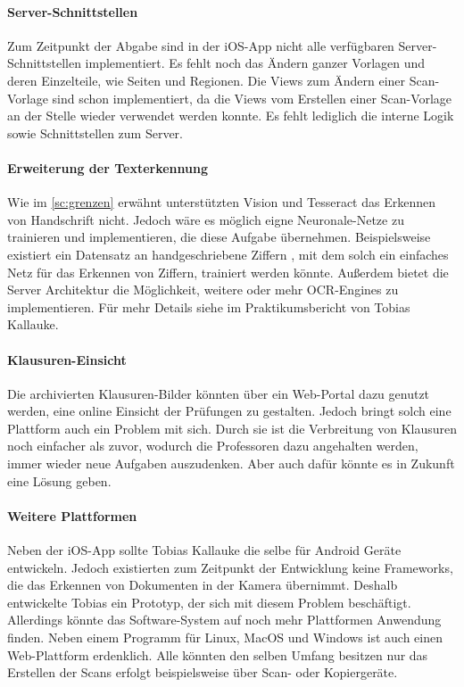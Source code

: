 \documentclass[notables, nomenclature, oneside, 150]{HSMW-Thesis}
\begin{document}
	
	\paragraph*{Server-Schnittstellen} 
		Zum Zeitpunkt der Abgabe sind in der iOS-App nicht alle verfügbaren Server-Schnittstellen implementiert. Es fehlt noch das Ändern ganzer Vorlagen und deren Einzelteile, wie Seiten und Regionen. Die Views zum Ändern einer Scan-Vorlage sind schon implementiert, da die Views vom Erstellen einer Scan-Vorlage an der Stelle wieder verwendet werden konnte. Es fehlt lediglich die interne Logik sowie Schnittstellen zum Server.	
	
	\paragraph*{Erweiterung der Texterkennung} 
		Wie im \autoref{sc:grenzen} erwähnt unterstützten Vision und Tesseract das Erkennen von Handschrift nicht. Jedoch wäre es möglich eigne Neuronale-Netze zu trainieren und implementieren, die diese Aufgabe übernehmen. Beispielsweise existiert ein Datensatz an handgeschriebene Ziffern , mit dem solch ein einfaches Netz für das Erkennen von Ziffern, trainiert werden könnte. Außerdem bietet die Server Architektur die Möglichkeit, weitere oder mehr OCR-Engines zu implementieren. Für mehr Details siehe im Praktikumsbericht von Tobias Kallauke.
	
	\paragraph*{Klausuren-Einsicht} 
		Die archivierten Klausuren-Bilder könnten über ein Web-Portal dazu genutzt werden, eine online Einsicht der Prüfungen zu gestalten. Jedoch bringt solch eine Plattform auch ein Problem mit sich. Durch sie ist die Verbreitung von Klausuren noch einfacher als zuvor, wodurch die Professoren dazu angehalten werden, immer wieder neue Aufgaben auszudenken. Aber auch dafür könnte es in Zukunft eine Lösung geben. 
	
	\paragraph*{Weitere Plattformen} 
		Neben der iOS-App sollte Tobias Kallauke die selbe für Android Geräte entwickeln. Jedoch existierten zum Zeitpunkt der Entwicklung keine Frameworks, die das Erkennen von Dokumenten in der Kamera übernimmt. Deshalb entwickelte Tobias ein Prototyp, der sich mit diesem Problem beschäftigt. Allerdings könnte das Software-System auf noch mehr Plattformen Anwendung finden. Neben einem Programm für Linux, MacOS und Windows ist auch einen Web-Plattform  erdenklich. Alle könnten den selben Umfang besitzen nur das Erstellen der Scans erfolgt beispielsweise über Scan- oder Kopiergeräte.
	
\end{document}
